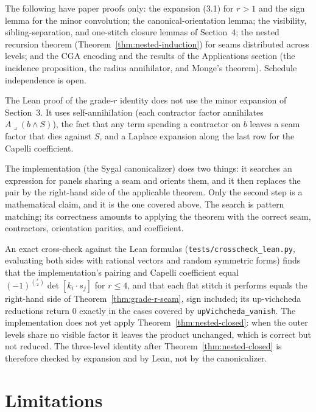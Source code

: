 \documentclass[11pt]{article}
\begin{document}
The following have paper proofs only: the expansion (3.1) for \(r>1\) and the
sign lemma for the minor convolution; the canonical-orientation lemma; the
visibility, sibling-separation, and one-stitch closure lemmas of Section~4;
the nested recursion theorem (Theorem~\ref{thm:nested-induction}) for seams
distributed across levels; and the CGA encoding and the results of the
Applications section (the incidence proposition, the radius annihilator, and
Monge's theorem). Schedule independence is open.

The Lean proof of the grade-\(r\) identity does not use the minor expansion
of Section~3. It uses self-annihilation (each contractor factor annihilates
\(A\mathbin{\lrcorner}(b\wedge S)\)), the fact that any term spending a
contractor on \(b\) leaves a seam factor that dies against \(S\), and a
Laplace expansion along the last row for the Capelli coefficient.

The implementation (the Sygal canonicalizer) does two things: it searches an
expression for panels sharing a seam and orients them, and it then replaces
the pair by the right-hand side of the applicable theorem. Only the second
step is a mathematical claim, and it is the one covered above. The search is
pattern matching; its correctness amounts to applying the theorem with the
correct seam, contractors, orientation parities, and coefficient.

An exact cross-check against the Lean formulas (\texttt{tests/crosscheck\_lean.py},
evaluating both sides with rational vectors and random symmetric forms) finds
that the implementation's pairing and Capelli coefficient equal
\((-1)^{\binom r2}\det[k_i\cdot s_j]\) for \(r\le 4\), and that each flat
stitch it performs equals the right-hand side of
Theorem~\ref{thm:grade-r-seam}, sign included; its up-vichcheda reductions
return \(0\) exactly in the cases covered by \texttt{upVichcheda\_vanish}.
The implementation does not
yet apply Theorem~\ref{thm:nested-closed}: when the outer levels share no
visible factor it leaves the product unchanged, which is correct but not
reduced. The three-level identity after Theorem~\ref{thm:nested-closed} is
therefore checked by expansion and by Lean, not by the canonicalizer.

\section{Limitations}
\end{document}
